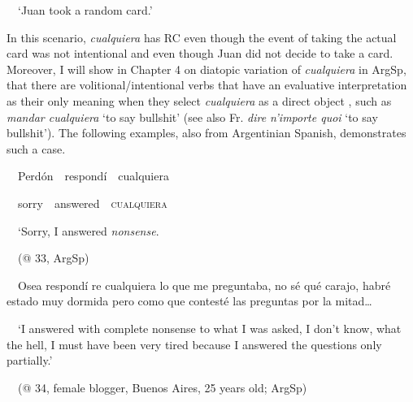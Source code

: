 \begin{styleStandard}
\ \ ‘Juan took a random card.’
\end{styleStandard}

\begin{styleStandard}
In this scenario, \textit{cualquiera} has RC even though the event of taking the actual card was not intentional and even though Juan did not decide to take a card. Moreover, I will show in Chapter 4 on diatopic variation of \textit{cualquiera} in ArgSp, that there are volitional/intentional verbs that have an evaluative interpretation as their only meaning when they select \textit{cualquiera} as a direct object , such as \textit{mandar cualquiera }‘to say bullshit’ (see also Fr. \textit{dire n’importe quoi }‘to say bullshit’). The following examples, also from Argentinian Spanish, demonstrates such a case.
\end{styleStandard}

\begin{styleStandard}
\ \ Perdón\ \ respondí\ \ cualquiera\ \ 
\end{styleStandard}

\begin{styleStandard}
\ \ sorry\ \ answered\ \ \textsc{cualquiera}
\end{styleStandard}

\begin{styleStandard}
\ \ ‘Sorry, I answered \textit{nonsense}. 
\end{styleStandard}

\begin{styleStandard}
\ \ (@ 33, ArgSp)
\end{styleStandard}

\begin{styleStandard}
\ \ Osea respondí re cualquiera lo que me preguntaba, no sé qué carajo, habré estado muy dormida pero como que contesté las preguntas por la mitad… 
\end{styleStandard}

\begin{styleStandard}
\ \ ‘I answered with complete nonsense to what I was asked, I don’t know, what the hell, I must have been very tired because I answered the questions only partially.’
\end{styleStandard}

\begin{styleStandard}
\ \ (@ 34, female blogger, Buenos Aires, 25 years old; ArgSp)
\end{styleStandard}

